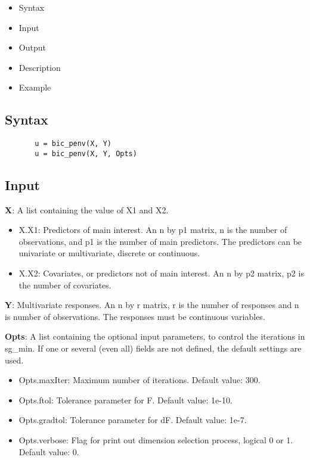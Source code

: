\documentclass[a4paper,11pt,openany]{memoir}
\begin{document}
\begin{itemize}
\setlength{\itemsep}{-1ex}
   \item Syntax
   \item Input
   \item Output
   \item Description
   \item Example
\end{itemize}


\subsection*{Syntax}


\begin{verbatim}       u = bic_penv(X, Y)
       u = bic_penv(X, Y, Opts)\end{verbatim}
    

\subsection*{Input}

\begin{par}
\textbf{X}: A list containing the value of X1 and X2.
\end{par} \vspace{1em}
\begin{itemize}
\setlength{\itemsep}{-1ex}
   \item X.X1: Predictors of main interest. An n by p1 matrix, n is the number of observations, and p1 is the number of main predictors. The predictors can be univariate or multivariate, discrete or continuous.
   \item X.X2: Covariates, or predictors not of main interest.  An n by p2 matrix, p2 is the number of covariates.
\end{itemize}
\begin{par}
\textbf{Y}: Multivariate responses. An n by r matrix, r is the number of responses and n is number of observations. The responses must be continuous variables.
\end{par} \vspace{1em}
\begin{par}
\textbf{Opts}: A list containing the optional input parameters, to control the iterations in sg\_min. If one or several (even all) fields are not defined, the default settings are used.
\end{par} \vspace{1em}
\begin{itemize}
\setlength{\itemsep}{-1ex}
   \item Opts.maxIter: Maximum number of iterations.  Default value: 300.
   \item Opts.ftol: Tolerance parameter for F.  Default value: 1e-10.
   \item Opts.gradtol: Tolerance parameter for dF.  Default value: 1e-7.
   \item Opts.verbose: Flag for print out dimension selection process, logical 0 or 1. Default value: 0.
\end{itemize}
\end{document}

